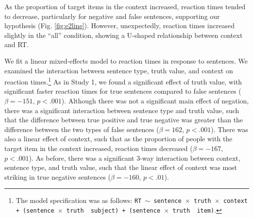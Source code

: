 \documentclass[10pt,letterpaper]{article}
\begin{document}

As the proportion of target items in the context increased, reaction times tended to decrease, particularly for negative and false sentences, supporting our hypothesis (Fig. \ref{fig:e2line}).  However, unexpectedly, reaction times increased slightly in the ``all'' condition, showing a U-shaped relationship between context and RT.  

We fit a linear mixed-effects model to reaction times in response to sentences.  We examined the interaction between sentence type, truth value, and context on reaction times.\footnote{The model specification was as follows: \texttt{RT $\sim$ sentence~$\times$~truth~$\times$~context + (sentence~$\times$~truth~\textbar~subject) +  (sentence~$\times$~truth~\textbar~item)}.}  As in Study 1, we found a significant effect of truth value, with significant faster reaction times for true sentences compared to false sentences ($\beta= -151$, $p< .001$).  Although there was not a significant main effect of negation, there was a significant interaction between sentence type and truth value, such that the difference between true positive and true negative was greater than the difference between the two types of false sentences ($\beta= 162$, $p< .001$).  There was also a linear effect of context, such that as the proportion of people with the target item in the context increased, reaction times decreased ($\beta= -167$, $p< .001$).  As before, there was a significant 3-way interaction between context, sentence type, and truth value, such that the linear effect of context was most striking in true negative sentences ($\beta= -160$, $p< .01$).
\end{document}
